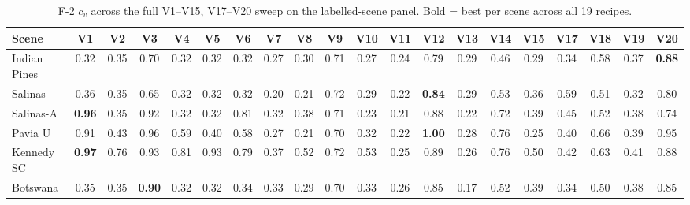 \documentclass[journal,a4paper,10pt]{IEEEtran}
\begin{document}
\begin{table}[ht]
\caption{F-2 $c_v$ across the full V1--V15, V17--V20 sweep on the
labelled-scene panel. Bold = best per scene across all 19 recipes.}
\label{tab:f2-full19}
\centering
\scriptsize
\setlength{\tabcolsep}{3pt}
\begin{tabular}{l*{19}{c}}
\toprule
Scene & V1 & V2 & V3 & V4 & V5 & V6 & V7 & V8 & V9 & V10 & V11 & V12 & V13 & V14 & V15 & V17 & V18 & V19 & V20 \\
\midrule
Indian Pines & 0.32 & 0.35 & 0.70 & 0.32 & 0.32 & 0.32 & 0.27 & 0.30 & 0.71 & 0.27 & 0.24 & 0.79 & 0.29 & 0.46 & 0.29 & 0.34 & 0.58 & 0.37 & \textbf{0.88} \\
Salinas      & 0.36 & 0.35 & 0.65 & 0.32 & 0.32 & 0.32 & 0.20 & 0.21 & 0.72 & 0.29 & 0.22 & \textbf{0.84} & 0.29 & 0.53 & 0.36 & 0.59 & 0.51 & 0.32 & 0.80 \\
Salinas-A    & \textbf{0.96} & 0.35 & 0.92 & 0.32 & 0.32 & 0.81 & 0.32 & 0.38 & 0.71 & 0.23 & 0.21 & 0.88 & 0.22 & 0.72 & 0.39 & 0.45 & 0.52 & 0.38 & 0.74 \\
Pavia U      & 0.91 & 0.43 & 0.96 & 0.59 & 0.40 & 0.58 & 0.27 & 0.21 & 0.70 & 0.32 & 0.22 & \textbf{1.00} & 0.28 & 0.76 & 0.25 & 0.40 & 0.66 & 0.39 & 0.95 \\
Kennedy SC   & \textbf{0.97} & 0.76 & 0.93 & 0.81 & 0.93 & 0.79 & 0.37 & 0.52 & 0.72 & 0.53 & 0.25 & 0.89 & 0.26 & 0.76 & 0.50 & 0.42 & 0.63 & 0.41 & 0.88 \\
Botswana     & 0.35 & 0.35 & \textbf{0.90} & 0.32 & 0.32 & 0.34 & 0.33 & 0.29 & 0.70 & 0.33 & 0.26 & 0.85 & 0.17 & 0.52 & 0.39 & 0.34 & 0.50 & 0.38 & 0.85 \\
\bottomrule
\end{tabular}
\end{table}
\end{document}
